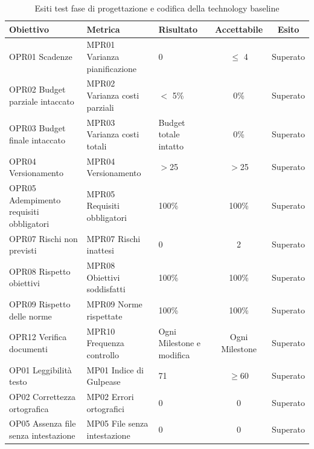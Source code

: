 \documentclass[../piano_di_qualifica.tex]{subfiles}
\begin{document}
\begin{table}[!ht]
	\centering
	\begin{tabular}{|p{4cm}|p{4cm}|l|c|c|}
		\hline
		\rowcolor{lightgray}
		\textbf{Obiettivo}            			& \textbf{Metrica}              & \textbf{Risultato}                    & \textbf{Accettabile} & \textbf{Esito} \\
		\hline
		OPR01 Scadenze		        			& MPR01 Varianza pianificazione & 0                             		& $\leq$ 4           	& Superato   	\\
		OPR02 Budget parziale intaccato        	& MPR02 Varianza costi parziali & $<$ 5\%								& 0\%                 	& Superato   	\\
		OPR03 Budget finale intaccato        	& MPR03 Varianza costi totali   & Budget totale intatto					& 0\%                  	& Superato      \\
		OPR04 Versionamento						& MPR04 Versionamento			& $>$25									& $>$25					& Superato		\\
		OPR05 Adempimento requisiti obbligatori & MPR05 Requisiti obbligatori 	& 100\%									& 100\%					& Superato		\\
		OPR07 Rischi non previsti				& MPR07 Rischi inattesi			& 0										& 2						& Superato	 	\\
		OPR08 Rispetto obiettivi      			& MPR08 Obiettivi soddisfatti   & 100\%                                 & 100\%                	& Superato      \\
		OPR09 Rispetto delle norme   			& MPR09 Norme rispettate        & 100\%                                 & 100\%                	& Superato      \\
		OPR12 Verifica documenti      			& MPR10 Frequenza controllo     & Ogni Milestone e modifica         	& Ogni Milestone       	& Superato      \\
		OP01 Leggibilità testo       			& MP01 Indice di Gulpease      	& 71                        			& \(\ge 60\)           	& Superato      \\
		OP02 Correttezza ortografica 			& MP02 Errori ortografici      	& 0                                     & 0                    	& Superato      \\
		OP05 Assenza file senza intestazione	& MP05 File senza intestazione 	& 0										& 0						& Superato		\\
		\hline
	\end{tabular}
	\caption{Esiti test fase di progettazione e codifica della technology baseline}
\end{table}
\end{document}
